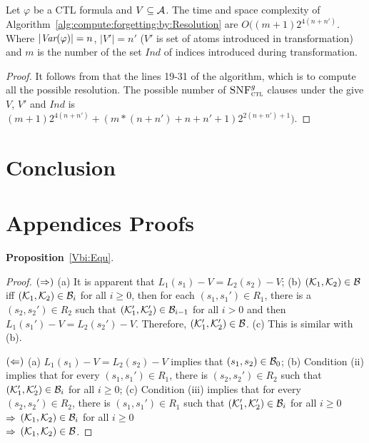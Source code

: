 \documentclass{article}
\begin{document}
\begin{proposition}
Let $\varphi$ be a CTL formula and $V \subseteq {\cal A}$.
The time and space complexity of Algorithm~\ref{alg:compute:forgetting:by:Resolution} are $O((m+1)2^{4(n+n')}$. Where $|\textit{Var}(\varphi)|=n$, $|V'|=n'$ ($V'$ is set of atoms introduced in transformation) and $m$ is the number of the set $Ind$ of indices introduced during transformation.
\end{proposition}
\begin{proof}
It follows from that the lines 19-31 of the algorithm, which is to compute all the possible resolution.
The possible number of ${\textsc{SNF}_{\textsc{ctl}}^g}$ clauses under the give $V$, $V'$ and $Ind$ is $(m+1)2^{4(n+n')}+(m*(n+n')+n+n'+1)2^{2(n+n')+1})$.
\end{proof}


\section{Conclusion}


\section{Appendices Proofs}

\textbf{Proposition}~\ref{Vbi:Equ}.
\begin{proof}
$(\Rightarrow)$
(a) It is apparent that $L_1(s_1)-V = L_2(s_2)-V$;
(b) %
$({\cal K}_1, {\cal K}_2) \in {\cal B}$ iff $({\cal K}_1, {\cal K}_2) \in {\cal B}_i$ for all $i \geq 0$, then for each $(s_1, s_1') \in R_1$, there is a $(s_2, s_2')\in R_2$  such that  $({\cal K}_1', {\cal K}_2') \in {\cal B}_{i-1}$ for all $i > 0$ and then $L_1(s_1')-V = L_2(s_2')-V$. Therefore, $({\cal K}_1', {\cal K}_2') \in {\cal B}$.
(c) %
 This is similar with (b).

$(\Leftarrow)$ (a) $L_1(s_1)- V = L_2(s_2)-V$ implies that $(s_1, s_2) \in {\cal B}_0$;
(b) Condition (ii) implies that for every $(s_1,s_1')\in R_1$, there is $(s_2,s_2')\in R_2$
    such that $({\cal K}_1',{\cal K}_2')\in {\cal B}_i$ for all $i \geq 0$;
(c) Condition (iii) implies that for every $(s_2,s_2')\in R_2$, there is $(s_1,s_1')\in R_1$
    such that $({\cal K}_1',{\cal K}_2')\in {\cal B}_i$ for all $i \geq 0$\\
$\Rightarrow$ $({\cal K}_1, {\cal K}_2) \in {\cal B}_i$ for all $i \geq 0$\\
$\Rightarrow$ $({\cal K}_1,{\cal K}_2)\in\cal B$.
\end{proof}
\end{document}
